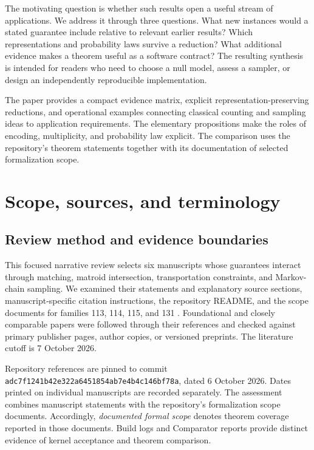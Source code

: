 \documentclass[11pt]{article}
\begin{document}
The motivating question is whether such results open a useful stream of applications. We address it through three questions. What new instances would a stated guarantee include relative to relevant earlier results? Which representations and probability laws survive a reduction? What additional evidence makes a theorem useful as a software contract? The resulting synthesis is intended for readers who need to choose a null model, assess a sampler, or design an independently reproducible implementation.

The paper provides a compact evidence matrix, explicit representation-preserving reductions, and operational examples connecting classical counting and sampling ideas to application requirements. The elementary propositions make the roles of encoding, multiplicity, and probability law explicit. The comparison uses the repository's theorem statements together with its documentation of selected formalization scope.

\section{Scope, sources, and terminology}
\subsection{Review method and evidence boundaries}
This focused narrative review selects six manuscripts whose guarantees interact through matching, matroid intersection, transportation constraints, and Markov-chain sampling. We examined their statements and explanatory source sections, manuscript-specific citation instructions, the repository README, and the scope documents for families 113, 114, 115, and 131 \cite{scope113,scope114,scope115,scope131}. Foundational and closely comparable papers were followed through their references and checked against primary publisher pages, author copies, or versioned preprints. The literature cutoff is 7 October 2026.

Repository references are pinned to commit
\nolinkurl{adc7f1241b42e322a6451854ab7e4b4c146bf78a}, dated 6 October 2026. Dates printed on individual manuscripts are recorded separately. The assessment combines manuscript statements with the repository's formalization scope documents. Accordingly, \emph{documented formal scope} denotes theorem coverage reported in those documents. Build logs and Comparator reports provide distinct evidence of kernel acceptance and theorem comparison.
\end{document}
